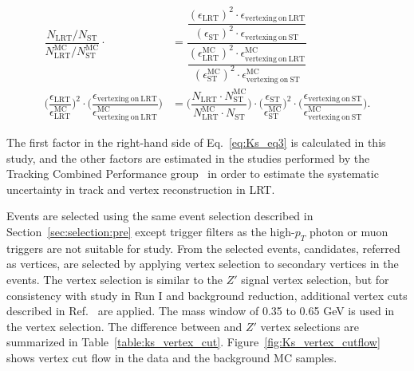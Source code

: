 \begin{align}
    \dfrac{N_{\mathrm{LRT}} / N_{\mathrm{ST}}}{N_{\mathrm{LRT}}^{\mathrm{MC}} / N_{\mathrm{ST}}^{\mathrm{MC}}} \cdot &=
    \dfrac{\dfrac{(\epsilon_{\mathrm{LRT}})^{2} \cdot \epsilon_{\mathrm{vertexing~on~LRT}}}{(\epsilon_{\mathrm{ST}})^{2} \cdot \epsilon_{\mathrm{vertexing~on~ST}}}}{\dfrac{(\epsilon_{\mathrm{LRT}}^{\mathrm{MC}})^{2} \cdot \epsilon_{\mathrm{vertexing~on~LRT}}^{\mathrm{MC}}}{(\epsilon_{\mathrm{ST}}^{\mathrm{MC}})^{2} \cdot \epsilon_{\mathrm{vertexing~on~ST}}^{\mathrm{MC}}}} 
    \\[10pt]
    \Big( \dfrac{\epsilon_{\mathrm{LRT}}}{\epsilon_{\mathrm{LRT}}^{\mathrm{MC}}}\Big)^{2} \cdot
    \Big( \dfrac{\epsilon_{\mathrm{vertexing~on~LRT}}}{\epsilon_{\mathrm{vertexing~on~LRT}}^{\mathrm{MC}}}\Big) &=
    \Big( \dfrac{N_{\mathrm{LRT}} \cdot N_{\mathrm{ST}}^{\mathrm{MC}}}{N_{\mathrm{LRT}}^{\mathrm{MC}} \cdot N_{\mathrm{ST}}} \Big) \cdot
    \Big( \dfrac{\epsilon_{\mathrm{ST}}}{\epsilon_{\mathrm{ST}}^{\mathrm{MC}}}\Big)^{2} \cdot
    \Big( \dfrac{\epsilon_{\mathrm{vertexing~on~ST}}}{\epsilon_{\mathrm{vertexing~on~ST}}^{\mathrm{MC}}}\Big).
\label{eq:Ks_eq3}
\end{align}

The first factor in the right-hand side of Eq.~\ref{eq:Ks_eq3} is calculated in this study, and the other factors are estimated in the studies performed by the Tracking Combined Performance group~\cite{ATL-PHYS-PUB-2015-051,Aaboud:2215485} in order to estimate the systematic uncertainty in track and vertex reconstruction in LRT.

Events are selected using the same event selection described in Section~\ref{sec:selection:pre} except trigger filters as the high-$p_{T}$ photon or muon triggers are not suitable for \Ks study. From the selected events, \Ks candidates, referred as \Ks vertices, are selected by applying \Ks vertex selection to secondary vertices in the events. The \Ks vertex selection is similar to the $Z'$ signal vertex selection, but for consistency with \Ks study in Run I and background reduction, additional vertex cuts described in Ref.~\cite{Aad:2011hd} are applied. The mass window of 0.35 to 0.65 GeV is used in the \Ks vertex selection. The difference between \Ks and $Z'$ vertex selections are summarized in Table~\ref{table:ks_vertex_cut}. Figure~\ref{fig:Ks_vertex_cutflow} shows \Ks vertex cut flow in the data and the background MC samples.

